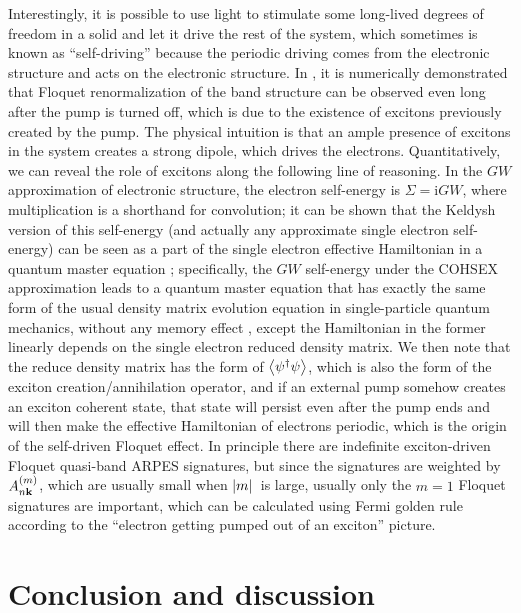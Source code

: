 \documentclass[hyperref, a4paper]{article}
\newcommand*{\ii}{\mathrm{i}}
\begin{document}
Interestingly, it is possible to use light to stimulate 
some long-lived degrees of freedom in a solid 
and let it drive the rest of the system, 
which sometimes is known as ``self-driving''
because the periodic driving comes from the electronic structure 
and acts on the electronic structure.
In \cite{chan2023giant}, it is numerically demonstrated that 
Floquet renormalization of the band structure can be observed 
even long after the pump is turned off, 
which is due to the existence of excitons previously created by the pump.
The physical intuition is that an ample presence of excitons in the system 
creates a strong dipole, which drives the electrons.
Quantitatively, we can reveal the role of excitons along the following line of reasoning.
In the $GW$ approximation of electronic structure, 
the electron self-energy is $\Sigma = \ii GW$, 
where multiplication is a shorthand for convolution;
it can be shown that the Keldysh version of this self-energy 
(and actually any approximate single electron self-energy) 
can be seen as a part of the single electron effective Hamiltonian 
in a quantum master equation \cite{vspivcka2005long}; 
specifically, the $GW$ self-energy under the COHSEX approximation 
leads to a quantum master equation that has exactly the same form 
of the usual density matrix evolution equation in single-particle quantum mechanics, 
without any memory effect
\cite{attaccalite2011real}, 
except the Hamiltonian in the former linearly depends 
on the single electron reduced density matrix.
We then note that the reduce density matrix has the form of $\expval{\psi^\dagger \psi}$,
which is also the form of the exciton creation/annihilation operator, 
and if an external pump somehow creates an exciton coherent state, 
that state will persist even after the pump ends 
and will then make the effective Hamiltonian of electrons periodic, 
which is the origin of the self-driven Floquet effect.
In principle there are indefinite exciton-driven Floquet quasi-band ARPES signatures,
but since the signatures are weighted by $A^{(m)}_{n \vb{k}}$,
which are usually small when $\abs*{m}$ is large, 
usually only the $m=1$ Floquet signatures are important,
which can be calculated using Fermi golden rule  
according to the ``electron getting pumped out of an exciton'' picture.

\section{Conclusion and discussion}
\end{document}
